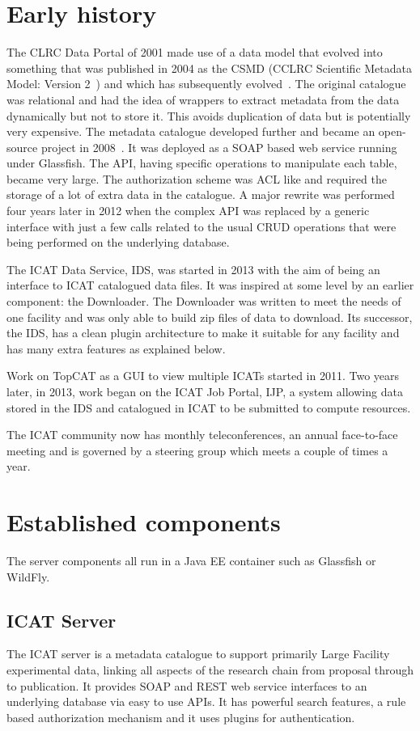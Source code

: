 \documentclass[a4paper]{jpconf}
\begin{document}
\section{Early history}
The CLRC Data Portal of 2001 made use of a data model that evolved
into something that was published in 2004 as the CSMD (CCLRC Scientific
Metadata Model: Version 2~\cite{ref:csmd2}) and which has subsequently
evolved~\cite{ref:csmd4}. The original catalogue was relational and
had the idea of wrappers to extract metadata from the data dynamically
but not to store it. This avoids duplication of data but is
potentially very expensive. The metadata catalogue developed further
and became an open-source project in 2008~\cite{ref:icat_09_1,
  ref:icat_09_2}. It was deployed as a SOAP based web service running
under Glassfish. The API, having specific operations to manipulate
each table, became very large. The authorization scheme was ACL like
and required the storage of a lot of extra data in the catalogue. A
major rewrite was performed four years later in 2012 when the complex
API was replaced by a generic interface with just a few calls related
to the usual CRUD operations that were being performed on the
underlying database.

The ICAT Data Service, IDS, was started in 2013 with the aim of being
an interface to ICAT catalogued data files. It was inspired at some
level by an earlier component: the Downloader. The Downloader was
written to meet the needs of one facility and was only able to build
zip files of data to download. Its successor, the IDS, has a clean
plugin architecture to make it suitable for any facility and has many
extra features as explained below.

Work on TopCAT as a GUI to view multiple ICATs started in 2011. Two
years later, in 2013, work began on the ICAT Job Portal, IJP, a system
allowing data stored in the IDS and catalogued in ICAT to be submitted
to compute resources.

The ICAT community now has monthly teleconferences, an annual
face-to-face meeting and is governed by a steering group which meets
a couple of times a year.
\section{Established components}
The server components all run in a Java EE container such as Glassfish
or WildFly.
\subsection{ICAT Server}
The ICAT server is a metadata catalogue to support primarily Large
Facility experimental data, linking all aspects of the research chain
from proposal through to publication. It provides SOAP and REST web
service interfaces to an underlying database via easy to use APIs. It
has powerful search features, a rule based authorization mechanism and
it uses plugins for authentication. 
\end{document}
